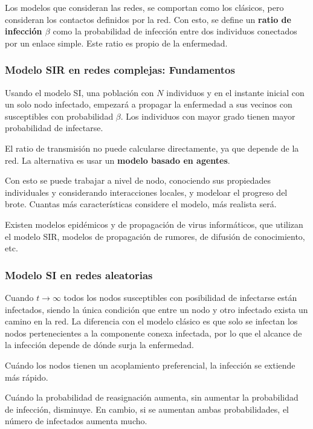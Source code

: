 \documentclass[10pt,spanish, landscape, twocolumn]{article}
\begin{document}
Los modelos que consideran las redes, se comportan como los clásicos, pero consideran los contactos definidos por la red. Con esto, se define un \textbf{\textcolor{temasiete}{ratio de infección $\beta$}} como la probabilidad de infección entre dos individuos conectados por un enlace simple. Este ratio es propio de la enfermedad.

\subsubsection{\textcolor{temasiete}Modelo SIR en redes complejas: Fundamentos}

Usando el modelo SI, una población con $N$ individuos y en el instante inicial con un solo nodo infectado, empezará a propagar la enfermedad a sus vecinos con susceptibles con probabilidad $\beta$. Los individuos con mayor grado tienen mayor probabilidad de infectarse. 

El ratio de transmisión no puede calcularse directamente, ya que depende de la red. La alternativa es usar un \textbf{\textcolor{temasiete}{modelo basado en agentes}}.

Con esto se puede trabajar a nivel de nodo, conociendo sus propiedades individuales y considerando interacciones locales, y modeloar el progreso del brote. Cuantas más características considere el modelo, más realista será.

Existen modelos epidémicos y de propagación de virus informáticos, que utilizan el modelo SIR, modelos de propagación de rumores, de difusión de conocimiento, etc.

\subsubsection{\textcolor{temasiete}Modelo SI en redes aleatorias}

Cuando $t\rightarrow\infty$ todos los nodos susceptibles con posibilidad de infectarse están infectados, siendo la única condición que entre un nodo y otro infectado exista un camino en la red. La diferencia con el modelo clásico es que solo se infectan los nodos pertenecientes a la componente conexa infectada, por lo que el alcance de la infección depende de dónde surja la enfermedad.

Cuándo los nodos tienen un acoplamiento preferencial, la infección se extiende más rápido.

Cuándo la probabilidad de reasignación aumenta, sin aumentar la probabilidad de infección, disminuye. En cambio, si se aumentan ambas probabilidades, el número de infectados aumenta mucho.
\end{document}
